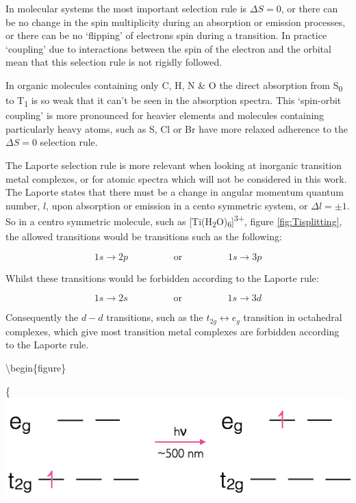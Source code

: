 \documentclass[
]{book}
\begin{document}
In molecular systems the most important selection rule is \(\Delta S = 0\), or there can be no change in the spin multiplicity during an absorption or emission processes, or there can be no `flipping' of electrons spin during a transition. In practice `coupling' due to interactions between the spin of the electron and the orbital mean that this selection rule is not rigidly followed.

In organic molecules containing only C, H, N \& O the direct absorption from S\textsubscript{0} to T\textsubscript{1} is so weak that it can't be seen in the absorption spectra. This `spin-orbit coupling' is more pronounced for heavier elements and molecules containing particularly heavy atoms, such as S, Cl or Br have more relaxed adherence to the \(\Delta S = 0\) selection rule.

The Laporte selection rule is more relevant when looking at inorganic transition metal complexes, or for atomic spectra which will not be considered in this work. The Laporte states that there must be a change in angular momentum quantum number, \(l\), upon absorption or emission in a cento symmetric system, or \(\Delta l = \pm 1\). So in a centro symmetric molecule, such as {[}Ti(H\textsubscript{2}O)\textsubscript{6}{]}\textsuperscript{3+}, figure \ref{fig:Tisplitting}, the allowed transitions would be transitions such as the following:

\begin{equation*}
1s \longrightarrow 2p \hspace{2cm}\textrm{or} \hspace{2cm} 1s \longrightarrow 3p
\end{equation*}

Whilst these transitions would be forbidden according to the Laporte rule:

\begin{equation*}
1s \longrightarrow 2s \hspace{2cm}\textrm{or} \hspace{2cm} 1s \longrightarrow 3d
\end{equation*}

Consequently the \(d-d\) transitions, such as the \(t_{2g} \longleftrightarrow e_g\) transition in octahedral complexes, which give most transition metal complexes are forbidden according to the Laporte rule.

\textbackslash begin\{figure\}

\{\centering \includegraphics[width=0.6\linewidth]{images/Ti3splitting}
\end{document}

